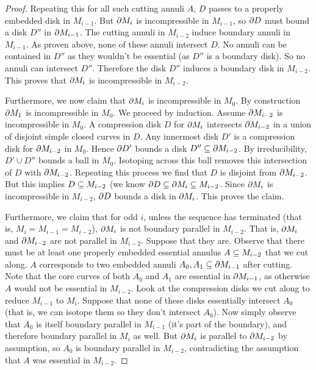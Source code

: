 \begin{proof}
Repeating this for all such cutting annuli $A$, $D$ passes to a properly
embedded disk in $M_{i-1}$. But $\partial M_i$ is incompressible in $M_{i-1}$, so
$\partial D$ must bound a disk $D''$ in $\partial M_{i-1}$. The cutting annuli in
$M_{i-2}$ induce boundary annuli in $M_{i-1}$. As proven above, none of these
annuli intersect $D$.  No annuli can be contained in $D''$ as they wouldn't be
essential (as $D''$ is a boundary disk). So no annuli can intersect $D''$.
Therefore the disk $D''$ induces a boundary disk in $M_{i-2}$. This proves that
$\partial M_i$ is incompressible in $M_{i-2}$.

Furthermore, we now claim that $\partial M_i$ is incompressible in $M_0$. By
construction $\partial M_1$ is incompressible in $M_0$. We proceed by induction.
Assume $\partial M_{i-2}$ is incompressible in $M_0$. A compression disk $D$ for
$\partial M_i$ intersects $\partial M_{i-2}$ in a union of disjoint simple closed curves
in $D$. Any innermost disk $D'$ is a compression disk for $\partial M_{i-2}$ in
$M_0$. Hence $\partial D'$ bounds a disk $D'' \subseteq \partial M_{i-2}$. By irreducibility,
$D' \cup D''$ bounds a ball in $M_0$. Isotoping across this ball removes this
intersection of $D$ with $\partial M_{i-2}$. Repeating this process we find that $D$
is disjoint from $\partial M_{i-2}$. But this implies $D \subseteq M_{i-2}$ (we know $\partial
D \subseteq \partial M_i \subseteq M_{i-2}$. Since $\partial M_i$ is incompressible in $M_{i-2}$,
$\partial D$ bounds a disk in $\partial M_i$. This proves the claim.

Furthermore, we claim that for odd $i$, unless the sequence has terminated
(that is, $M_i=M_{i-1}=M_{i-2}$), $\partial M_i$ is not boundary parallel in
$M_{i-2}$.  That is, $\partial M_i$ and $\partial M_{i-2}$ are not parallel in $M_{i-2}$.
Suppose that they are.  Observe that there must be at least one properly
embedded essential annulus $A \subseteq M_{i-2}$ that we cut along. $A$ corresponds
to two embedded annuli $A_0, A_1 \subseteq \partial M_{i-1}$ after cutting.  Note that
the core curves of both $A_0$ and $A_1$ are essential in $\partial M_{i-1}$, as
otherwise $A$ would not be essential in $M_{i-2}$.  Look at the compression
disks we cut along to reduce $M_{i-1}$ to $M_i$.  Suppose that none of these
disks essentially intersect $A_0$ (that is, we can isotope them so they don't
intersect $A_0$). Now simply observe that $A_0$ is itself boundary parallel in
$M_{i-1}$ (it's part of the boundary), and therefore boundary parallel in $M_i$
as well. But $\partial M_i$ is parallel to $\partial M_{i-2}$ by assumption, so $A_0$ is
boundary parallel in $M_{i-2}$, contradicting the assumption that $A$ was
essential in $M_{i-2}$.


\end{proof}

